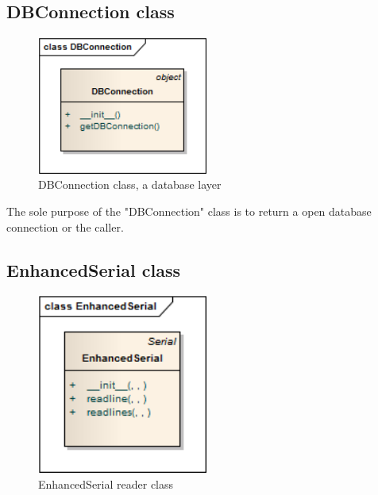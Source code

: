 \newpage
\subsection{DBConnection class}
\begin{figure}[H]
   \centering
   \includegraphics[width=0.5\textwidth]{pic/DBConnection.png}%
   \caption{DBConnection class, a database layer}
   \label{DBConnectionpic}%
\end{figure}

The sole purpose of the "DBConnection" class is to return a open database connection or the caller. 

\newpage
\subsection{EnhancedSerial class}
\begin{figure}[H]
   \centering
   \includegraphics[width=0.5\textwidth]{pic/EnhancedSerial.png}%
   \caption{EnhancedSerial reader class}
   \label{EnhancedSerialpic}%
\end{figure}

\newpage

